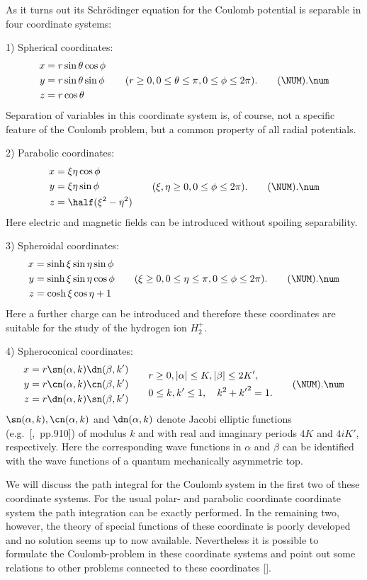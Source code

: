 As it turns out its Schr\"odinger equation for the Coulomb potential
is separable in four coordinate systems:
\item{1)} Spherical coordinates:
\plus
$$\aligned
  x&=r\sin\theta\cos\phi\\
  y&=r\sin\theta\sin\phi\\
  z&=r\cos\theta
  \endaligned\qquad
  (r\geq0,0\leq\theta\leq\pi,0\leq\phi\leq2\pi).
  \tag\NUM.\num$$\plus%
Separation of variables in this coordinate system is, of course, not a
specific feature of the Coulomb problem, but a common property of all
radial potentials.
\item{2)} Parabolic coordinates:
$$\aligned
  x&=\xi\eta\cos\phi\\
  y&=\xi\eta\sin\phi\\
  z&=\half(\xi^2-\eta^2)
  \endaligned\qquad
  (\xi,\eta\geq0,0\leq\phi\leq2\pi).
  \tag\NUM.\num$$\plus%
Here electric and magnetic fields can be introduced without spoiling
separability.
\item{3)} Spheroidal coordinates:
$$\aligned
  x&=\sinh\xi\sin\eta\sin\phi\\
  y&=\sinh\xi\sin\eta\cos\phi\\
  z&=\cosh\xi\cos\eta+1
  \endaligned\qquad
  (\xi\geq0,0\leq\eta\leq\pi,0\leq\phi\leq2\pi).
  \tag\NUM.\num$$\plus%
Here a further charge can be introduced and therefore these coordinates
are suitable for the study of the hydrogen ion $H_2^+$.
\item{4)} Spheroconical coordinates:
$$\aligned
  x&=r\sn(\alpha,k)\dn(\beta,k')\\
  y&=r\cn(\alpha,k)\cn(\beta,k')\\
  z&=r\dn(\alpha,k)\sn(\beta,k')
  \endaligned\qquad\aligned
  & r\geq0,\vert\alpha\vert\leq K,\vert\beta\vert\leq2K',\\
  & 0\leq k,k'\leq1,\quad k^2+{k'}^2=1.
  \endaligned
  \tag\NUM.\num$$\edef\numFHbc{\NUM.\num}\plus%
$\sn(\alpha,k),\cn(\alpha,k)$ and $\dn(\alpha,k)$ denote Jacobi
elliptic functions (e.g.\ [\GRA,\ pp.910]) of
modulus $k$ and with real
and imaginary periods $4K$ and $4iK'$, respectively. Here the
corresponding wave functions in $\alpha$ and $\beta$ can be identified
with the wave functions of a quantum mechanically asymmetric top.

We will discuss the path integral for the Coulomb system in the first
two of these coordinate systems. For the usual polar- and parabolic
coordinate coordinate system the path integration can be exactly
performed. In the remaining two, however, the theory of special
functions of these coordinate is poorly developed and no solution seems
up to now available. Nevertheless it is possible to formulate the
Coulomb-problem in these coordinate systems and point out some
relations to other problems connected to these coordinates [\GROm].

